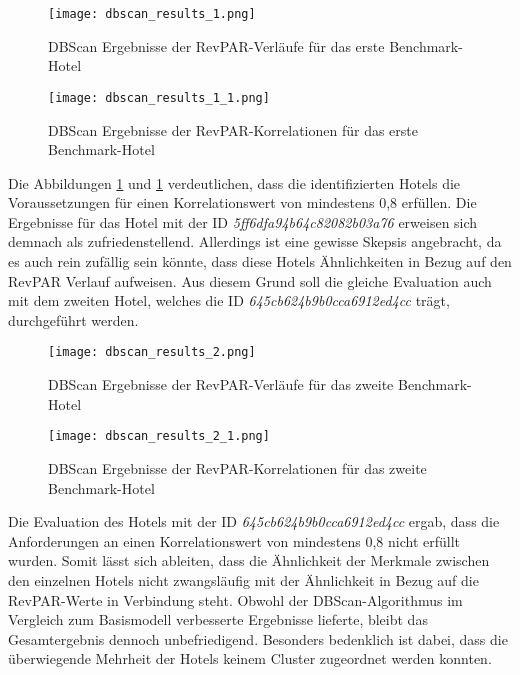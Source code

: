\begin{figure}[h]
    \centering
    \texttt{[image: dbscan\_results\_1.png]}
    \caption[DBScan Ergebnisse der RevPAR-Verläufe für das erste Benchmark-Hotel]{DBScan Ergebnisse der RevPAR-Verläufe für das erste Benchmark-Hotel}
    \label{img:dbscan_results_1}
\end{figure}

\begin{figure}[h]
    \centering
    \texttt{[image: dbscan\_results\_1\_1.png]}
    \caption[DBScan Ergebnisse der RevPAR-Korrelationen für das erste Benchmark-Hotel]{DBScan Ergebnisse der RevPAR-Korrelationen für das erste Benchmark-Hotel}
    \label{img:dbscan_results_1_1}
\end{figure}

Die Abbildungen \ref{img:dbscan_results_1} und \ref{img:dbscan_results_1} verdeutlichen, dass die identifizierten Hotels die Voraussetzungen für einen Korrelationswert von mindestens 0,8 erfüllen. Die Ergebnisse für das Hotel mit der ID \emph{5ff6dfa94b64c82082b03a76} erweisen sich demnach als zufriedenstellend. Allerdings ist eine gewisse Skepsis angebracht, da es auch rein zufällig sein könnte, dass diese Hotels Ähnlichkeiten in Bezug auf den RevPAR Verlauf aufweisen. Aus diesem Grund soll die gleiche Evaluation auch mit dem zweiten Hotel, welches die ID \emph{645cb624b9b0cca6912ed4cc} trägt, durchgeführt werden.

\begin{figure}[h]
    \centering
    \texttt{[image: dbscan\_results\_2.png]}
    \caption[DBScan Ergebnisse der RevPAR-Verläufe für das zweite Benchmark-Hotel]{DBScan Ergebnisse der RevPAR-Verläufe für das zweite Benchmark-Hotel}
    \label{img:dbscan_results_2}
\end{figure}

\begin{figure}[h]
    \centering
    \texttt{[image: dbscan\_results\_2\_1.png]}
    \caption[DBScan Ergebnisse der RevPAR-Korrelationen für das zweiten Benchmark-Hotel]{DBScan Ergebnisse der RevPAR-Korrelationen für das zweite Benchmark-Hotel}
    \label{img:dbscan_results_2_1}
\end{figure}

Die Evaluation des Hotels mit der ID \emph{645cb624b9b0cca6912ed4cc} ergab, dass die Anforderungen an einen Korrelationswert von mindestens 0,8 nicht erfüllt wurden. Somit lässt sich ableiten, dass die Ähnlichkeit der Merkmale zwischen den einzelnen Hotels nicht zwangsläufig mit der Ähnlichkeit in Bezug auf die RevPAR-Werte in Verbindung steht. 
\newline
\newline
Obwohl der DBScan-Algorithmus im Vergleich zum Basismodell verbesserte Ergebnisse lieferte, bleibt das Gesamtergebnis dennoch unbefriedigend. Besonders bedenklich ist dabei, dass die überwiegende Mehrheit der Hotels keinem Cluster zugeordnet werden konnten.


